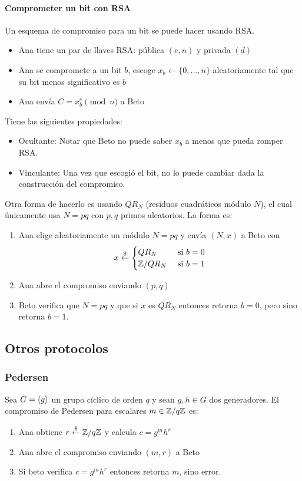   \paragraph{Comprometer un bit con RSA}
  Un esquema de compromiso para un bit se puede hacer usando RSA.
  \begin{itemize}
    \item Ana tiene un par de llaves RSA: pública $(e,n)$ y privada $(d)$
    \item Ana se compromete a un bit $b$, escoge $x_b \leftarrow \{0,\dots,n\}$ 
      aleatoriamente tal que su bit menos significativo es $b$ 
    \item Ana envía $C = x_b^e \pmod{n}$ a Beto 
  \end{itemize}
  Tiene las siguientes propiedades:
  \begin{itemize}
    \item Ocultante: Notar que Beto no puede saber $x_b$ a menos que pueda romper RSA.
    \item Vinculante: Una vez que escogió el bit, no lo puede cambiar dada la construcción del compromiso.
  \end{itemize}

  Otra forma de hacerlo es usando $QR_N$ (residuos cuadráticos módulo $N$), el cual 
  únicamente usa $N = pq$ con $p,q$ primos aleatorios.
  La forma es:
  \begin{enumerate}
    \item Ana elige aleatoriamente un módulo $N = pq$ y envía $(N,x)$ a Beto con 
      \begin{equation*}
        x \overset{\$}{\leftarrow} \begin{cases} QR_N &\text{ si }b=0 \\ \mathbb{Z}/QR_N &\text{ si }b=1 \end{cases}
      \end{equation*}
    \item Ana abre el compromiso enviando $(p,q)$
    \item Beto verifica que $N = pq$ y que si $x$ es $QR_N$ entonces retorna $b=0$,
      pero sino retorna $b=1$.
  \end{enumerate}

  \subsection{Otros protocolos}
  \subsubsection{Pedersen}
  Sea $G = \left\langle g \right\rangle$ un grupo cíclico de orden $q$ y sean $g,h\in G$ dos generadores.
  El compromiso de Pedersen para escalares $m\in\mathbb{Z}/q\mathbb{Z}$ es:
  \begin{enumerate}
    \item Ana obtiene $r \overset{\$}{\leftarrow} \mathbb{Z}/q\mathbb{Z}$ y calcula $c=g^mh^r$
    \item Ana abre el compromiso enviando $(m,r)$ a Beto
    \item Si beto verifica $c = g^mh^r$ entonces retorna $m$, sino error.
  \end{enumerate}

